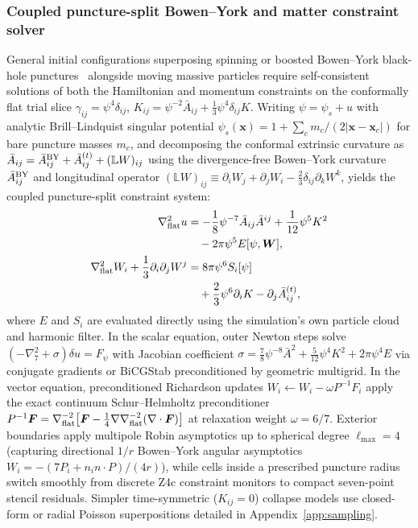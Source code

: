 \subsubsection{Coupled puncture-split Bowen--York and matter constraint solver}

General initial configurations superposing spinning or boosted Bowen--York black-hole punctures~\cite{Bowen:1980yu} alongside moving massive particles require self-consistent solutions of both the Hamiltonian and momentum constraints on the conformally flat trial slice $\gamma_{ij} = \psi^4\delta_{ij}$, $K_{ij} = \psi^{-2}\bar{A}_{ij} + \frac{1}{3}\psi^4\delta_{ij}K$. Writing $\psi = \psi_s + u$ with analytic Brill--Lindquist singular potential $\psi_s(\bm{x}) = 1 + \sum_c m_c/(2|\bm{x}-\bm{x}_c|)$ for bare puncture masses $m_c$, and decomposing the conformal extrinsic curvature as $\bar{A}_{ij} = \bar{A}_{ij}^{\rm BY} + \bar{A}_{ij}^{(t)} + (\mathbb{L}W)_{ij}$ using the divergence-free Bowen--York curvature $\bar{A}_{ij}^{\rm BY}$ and longitudinal operator $(\mathbb{L}W)_{ij} \equiv \partial_i W_j + \partial_j W_i - \frac{2}{3}\delta_{ij}\partial_k W^k$, yields the coupled puncture-split constraint system:
\begin{align}\label{eq:idsolve_system}
\nabla_{\rm flat}^2 u &= -\frac{1}{8}\psi^{-7}\bar{A}_{ij}\bar{A}^{ij} + \frac{1}{12}\psi^5 K^2 \nonumber\\
&\quad - 2\pi\psi^5 E[\psi, \bm{W}], \nonumber\\
\nabla_{\rm flat}^2 W_i + \frac{1}{3}\partial_i\partial_j W^j &= 8\pi\psi^6 S_i[\psi] \nonumber\\
&\quad + \frac{2}{3}\psi^6\partial_i K - \partial_j\bar{A}^{(t)}_{ij},
\end{align}
where $E$ and $S_i$ are evaluated directly using the simulation's own particle cloud and harmonic filter. In the scalar equation, outer Newton steps solve $(-\nabla_7^2 + \sigma)\delta u = F_\psi$ with Jacobian coefficient $\sigma = \frac{7}{8}\psi^{-8}\bar{A}^2 + \frac{5}{12}\psi^4 K^2 + 2\pi\psi^4 E$ via conjugate gradients or BiCGStab preconditioned by geometric multigrid. In the vector equation, preconditioned Richardson updates $W_i \leftarrow W_i - \omega P^{-1} F_i$ apply the exact continuum Schur--Helmholtz preconditioner $P^{-1}\bm{F} = \nabla_{\rm flat}^{-2}\bigl[\bm{F} - \frac{1}{4}\nabla\nabla_{\rm flat}^{-2}(\nabla\cdot\bm{F})\bigr]$ at relaxation weight $\omega = 6/7$. Exterior boundaries apply multipole Robin asymptotics up to spherical degree $\ell_{\max} = 4$ (capturing directional $1/r$ Bowen--York angular asymptotics $W_i = -(7P_i + n_i n\cdot P)/(4r)$), while cells inside a prescribed puncture radius switch smoothly from discrete Z4c constraint monitors to compact seven-point stencil residuals. Simpler time-symmetric ($K_{ij} = 0$) collapse models use closed-form or radial Poisson superpositions detailed in Appendix~\ref{app:sampling}.

